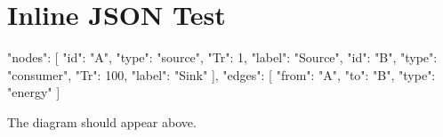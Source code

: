 \documentclass{article}
\begin{document}
\section{Inline JSON Test}

\begin{energeseData}
{
  "nodes": [
    {"id": "A", "type": "source", "Tr": 1, "label": "Source"},
    {"id": "B", "type": "consumer", "Tr": 100, "label": "Sink"}
  ],
  "edges": [
    {"from": "A", "to": "B", "type": "energy"}
  ]
}
\end{energeseData}

The diagram should appear above.
\end{document}
